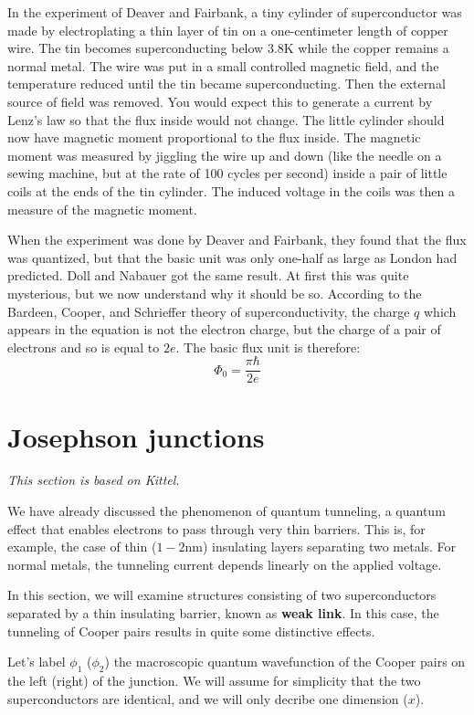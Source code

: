 \documentclass[a4paper,11pt]{article}
\begin{document}
In the experiment of Deaver and Fairbank, a tiny cylinder of superconductor was made by electroplating a thin layer of tin on a one-centimeter length of copper wire. The tin becomes superconducting below $3.8$K while the copper remains a normal metal. The wire was put in a small controlled magnetic field, and the temperature reduced until the tin became superconducting. Then the external source of field was removed. You would expect this to generate a current by Lenz’s law so that the flux inside would not change. The little cylinder should now have magnetic moment proportional to the flux inside. The magnetic moment was measured by jiggling the wire up and down (like the needle on a sewing machine, but at the rate of 100 cycles per second) inside a pair of little coils at the ends of the tin cylinder. The induced voltage in the coils was then a measure of the magnetic moment.

When the experiment was done by Deaver and Fairbank, they found that the flux was quantized, but that the basic unit was only one-half as large as London had predicted. Doll and Nabauer got the same result. At first this was quite mysterious, but we now understand why it should be so. According to the Bardeen, Cooper, and Schrieffer theory of superconductivity, the charge $q$ which appears in the equation is not the electron charge, but the charge of a pair of electrons and so is equal to $2e$. The basic flux unit is therefore:
\begin{equation}
    \Phi_0 = \frac{\pi \hbar}{2e}
\end{equation}

\section {Josephson junctions}
{\it This section is based on Kittel.}

We have already discussed the phenomenon of quantum tunneling, a quantum effect that enables electrons to pass through very thin barriers. This is, for example, the case of thin ($1-2$nm) insulating layers separating two metals. For normal metals, the tunneling current depends linearly on the applied voltage.

In this section, we will examine structures consisting of two superconductors separated by a thin insulating barrier, known as {\bf weak link}. In this case, the tunneling of Cooper pairs results in quite some distinctive effects.

Let's label $\phi_1$ ($\phi_2$) the macroscopic quantum wavefunction of the Cooper pairs on the left (right) of the junction. We will assume for simplicity that the two superconductors are identical, and we will only decribe one dimension ($x$).
\end{document}
